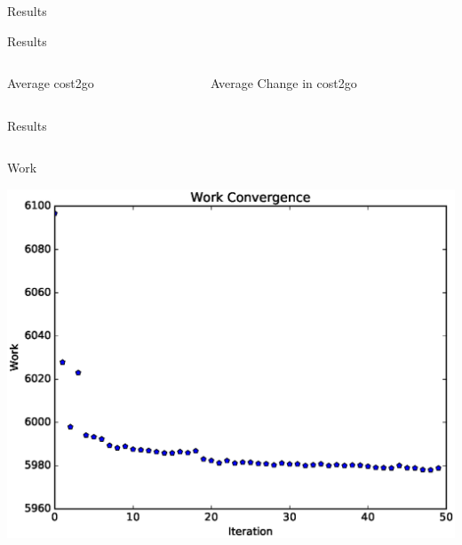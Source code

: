 \documentclass[xcolor=table, 9pt]{beamer}
\begin{document}
\begin{section}{Results}
\begin{frame}{Results}
    \begin{columns}
        \begin{column}{0.5\textwidth}
            \begin{block}{Average cost2go}
                \begin{center}
                \end{center}
            \end{block}
        \end{column}
        \begin{column}{0.5\textwidth}
            \begin{block}{Average Change in cost2go}
                \begin{center}
                \end{center}
            \end{block}
        \end{column}
    \end{columns}
\end{frame}
\begin{frame}{Results}
    \begin{columns}
        \begin{column}{0.33\textwidth}
            \begin{block}{Work}
                \begin{center}
                    \includegraphics[width=\textwidth,trim={0cm 0cm 0cm 0cm},clip]{img/EXP5_history_plots_work.eps}

\end{center}
\end{block}
\end{column}
\end{columns}
\end{frame}
\end{section}
\end{document}
